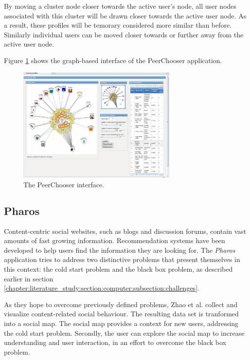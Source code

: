 By moving a cluster node closer towards the active user's node, all user nodes associated with this cluster will be drawn closer towards the active user node. As a result, these profiles will be temorary considered more similar than before. Similarly individual users can be moved closer towards or further away from the active user node\cite{odonovan:2008}.

Figure \ref{figure:peerchooser} shows the graph-based interface of the PeerChooser application.

\begin{figure}%
	\begin{center}
		\includegraphics[width=300px]{img/peerchooser}%
	\end{center}
	\caption{The PeerChooser interface.}%
	\label{figure:peerchooser}%
\end{figure}



\subsection{Pharos}\label{chapter:survey:section:applications:subsection:pharos}

Content-centric social websites, such as blogs and discussion forums, contain vast amounts of fast growing information. Recommendation systems have been developed to help users find the information they are looking for. The \emph{Pharos} application tries to address two distinctive problems that present themselves in this context: the cold start problem and the black box problem\cite{zhao:2010}, as described earlier in section \ref{chapter:literature_study:section:computer:subsection:challenges}.

As they hope to overcome previously defined problems, Zhao et al. \cite{zhao:2010} collect and visualize content-related social behaviour. The resulting data set is tranformed into a social map. The social map provides a context for new users, addressing the cold start problem. Secondly, the user can explore the social map to increase understanding and user interaction, in an effort to overcome the black box problem.

